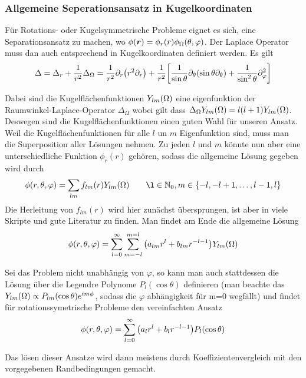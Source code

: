 \subsubsection{Allgemeine Seperationsansatz in Kugelkoordinaten}%
Für Rotations- oder Kugelsymmetrische Probleme eignet es sich, eine 
Separationsansatz zu machen, wo 
$\phi(\vb*r)=\phi_r(r)\phi_\Omega(\theta,\varphi)$.
Der Laplace Operator muss dan auch entsprechend in Kugelkoordinaten definiert
werden. Es gilt 
\begin{equation}
  \Delta=\Delta_r + \frac{1}{r^2}\Delta_\Omega=
  \frac{1}{r^2}\partial_{r} \qty(r^2\partial_{r}) + 
  \frac{1}{r^2}\qty[\frac{1}{\sin\theta}\partial_{\theta}\qty(\sin\theta\partial_{\theta})+
  \frac{1}{\sin^2\theta}\partial_{\varphi}^2] 
\end{equation}

Dabei sind die Kugelflächenfunktionen $Y_{lm}(\Omega)$ eine eigenfunktion der
Raumwinkel-Laplace-Operator $\Delta_\Omega$ wobei gilt dass
$\Delta_\Omega Y_{lm}(\Omega)=l(l+1)Y_{lm}(\Omega)$. Deswegen sind die Kugelflächenfunktionen einen
guten Wahl für unseren Ansatz. Weil die Kugelflächenfunktionen für alle
$l$ un $m$ Eigenfunktion sind, muss man die Superposition aller Lösungen
nehmen. Zu jeden $l$ und $m$ könnte nun aber eine unterschiedliche Funktion
$\phi_r(r)$ gehören, sodass die allgemeine Lösung gegeben wird durch
\begin{equation*}
  \phi(r,\theta,\varphi) = \sum_{lm} f_{lm}(r)\Y \qquad
  \l\in\mathbb{N}_0, m\in\{-l,-l+1,\ldots,l-1,l\}
\end{equation*}
Die Herleitung von $f_{lm}(r)$ wird hier zunächst übersprungen, ist aber
in viele Skripte und gute Literatur zu finden. Man findet am Ende die
allgemeine Lösung
\begin{equation}
  \phi(r,\theta,\varphi)=\sum_{l=0}^\infty\sum_{m=-l}^{m=l}
  \qty(a_{lm}r^l + b_{lm}r^{-l-1})Y_{lm}(\Omega)
\end{equation}

Sei das Problem nicht unabhängig von $\varphi$, so kann man auch stattdessen
die Lösung über die Legendre Polynome $P_l(\cos\theta)$ definieren 
(man beachte das $Y_{lm}(\Omega)\propto P_{lm}(\cos\theta)e^{im\phi}$, sodass die
$\varphi$ abhängigkeit für m=0 wegfällt) und findet für rotationssymetrische
Probleme den vereinfachten Ansatz
\begin{equation}
  \phi(r,\theta,\varphi)=\sum_{l=0}^\infty
  \qty(a_{l}r^l + b_{l}r^{-l-1})P_l(\cos\theta)
\end{equation}

Das lösen dieser Ansatze wird dann meistens durch Koeffizientenvergleich
mit den vorgegebenen Randbedingungen gemacht.
